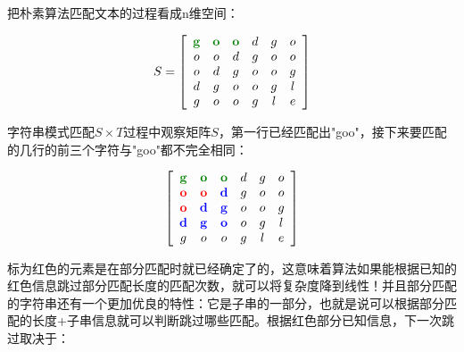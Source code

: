 \documentclass{article}
\begin{document}
	把朴素算法匹配文本的过程看成n维空间：

	$$
	S = 
	\left[\begin{array}{cccccc}
			\color{green!50!black}\mathbf{g} & \color{green!50!black}\mathbf{o} & \color{green!50!black}\mathbf{o} & d & g & o \\
			o&o&d&g&o&o \\ 
			o&d&g&o&o&g \\
			d&g&o&o&g&l \\
			g&o&o&g&l&e 
	\end{array}\right]
	$$
	
	字符串模式匹配$S \times T$过程中观察矩阵$S$，第一行已经匹配出"goo"，接下来要匹配的几行的前三个字符与"goo"都不完全相同：

	$$
	\left[\begin{array}{cccccc}
			\color{green!50!black}\mathbf{g} & \color{green!50!black}\mathbf{o} & \color{green!50!black}\mathbf{o} & d & g & o \\
			\color{red}\mathbf{o}&\color{red}\mathbf{o}&\color{blue}\mathbf{d}&g&o&o \\ 
			\color{red}\mathbf{o}&\color{blue}\mathbf{d}&\color{blue}\mathbf{g}&o&o&g \\
			\color{blue}\mathbf{d}&\color{blue}\mathbf{g}&\color{blue}\mathbf{o}&o&g&l \\
			g&o&o&g&l&e 
	\end{array}\right]
	$$

	标为红色的元素是在部分匹配时就已经确定了的，这意味着算法如果能根据已知的红色信息跳过部分匹配长度的匹配次数，就可以将复杂度降到线性！并且部分匹配的字符串还有一个更加优良的特性：它是子串的一部分，也就是说可以根据部分匹配的长度+子串信息就可以判断跳过哪些匹配。根据红色部分已知信息，下一次跳过取决于：

	\vspace{0.7cm}

\end{document}
